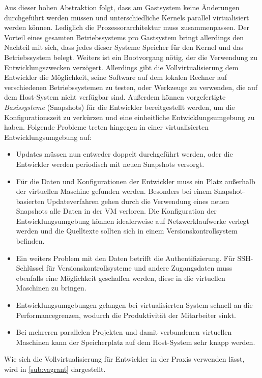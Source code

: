 Aus dieser hohen Abstraktion folgt, dass am Gastsystem keine Änderungen durchgeführt werden müssen und unterschiedliche Kernels parallel virtualisiert werden können.
Lediglich die Prozessorarchitektur muss zusammenpassen.
Der Vorteil eines gesamten Betriebssystems pro Gastsystem bringt allerdings den Nachteil mit sich, dass jedes dieser Systeme Speicher für den Kernel und das Betriebssystem belegt. Weiters ist ein Bootvorgang nötig, der die Verwendung zu Entwicklungszwecken verzögert.
Allerdings gibt die Vollvirtualisierung dem Entwickler die Möglichkeit, seine Software auf dem lokalen Rechner auf verschiedenen Betriebssystemen zu testen, oder Werkzeuge zu verwenden, die auf dem Host-System nicht verfügbar sind.
Außerdem können vorgefertigte \emph{Basissysteme} (Snapshots) für die Entwickler bereitgestellt werden, um die Konfigurationszeit zu verkürzen und eine einheitliche Entwicklungsumgebung zu haben.
Folgende Probleme treten hingegen in einer virtualisierten Entwicklungsumgebung auf:
\begin{itemize}
\item Updates müssen nun entweder doppelt durchgeführt werden, oder die Entwickler werden periodisch mit neuen Snapshots versorgt.
\item Für die Daten und Konfigurationen der Entwickler muss ein Platz außerhalb der virtuellen Maschine gefunden werden. Besonders bei einem Snapshot-basierten Updateverfahren gehen durch die Verwendung eines neuen Snapshots alle Daten in der VM verloren. Die Konfiguration der Entwicklungsumgebung können idealerweise auf Netzwerklaufwerke verlegt werden und die Quelltexte sollten sich in einem Versionskontrollsystem befinden.
\item Ein weiters Problem mit den Daten betrifft die Authentifizierung. Für SSH-Schlüssel für Versionskontrollsysteme und andere Zugangsdaten muss ebenfalls eine Möglichkeit geschaffen werden, diese in die virtuellen Maschinen zu bringen.
\item Entwicklungsumgebungen gelangen bei virtualisierten System schnell an die Performancegrenzen, wodurch die Produktivität der Mitarbeiter sinkt.
\item Bei mehreren parallelen Projekten und damit verbundenen virtuellen Maschinen kann der Speicherplatz auf dem Host-System sehr knapp werden.
\end{itemize}
Wie sich die Vollvirtualisierung für Entwickler in der Praxis verwenden lässt, wird in \cref{sub:vagrant} dargestellt.

